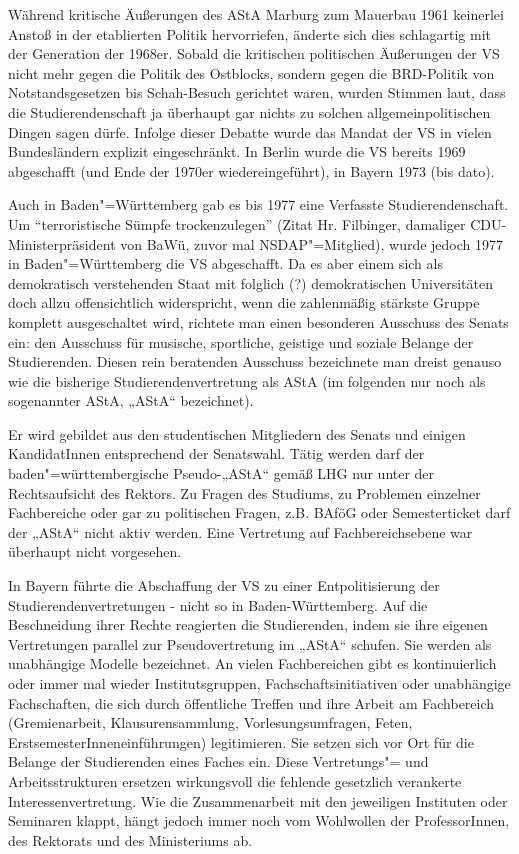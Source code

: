 Während kritische Äußerungen des AStA Marburg zum Mauerbau 1961 keinerlei Anstoß in der etablierten Politik hervorriefen, änderte sich dies schlagartig mit der Generation der 1968er. Sobald die kritischen politischen Äußerungen der VS nicht mehr gegen die Politik des Ostblocks, sondern gegen die BRD-Politik von Notstandsgesetzen bis Schah-Besuch gerichtet waren, wurden Stimmen laut, dass die Studierendenschaft ja überhaupt gar nichts zu solchen allgemeinpolitischen Dingen sagen dürfe. Infolge dieser Debatte wurde das Mandat der VS in vielen Bundesländern explizit eingeschränkt. In Berlin wurde die VS bereits 1969 abgeschafft (und Ende der 1970er wiedereingeführt), in Bayern 1973 (bis dato).

Auch in Baden"=Württemberg gab es bis 1977 eine Verfasste Studierendenschaft. Um "`terroristische Sümpfe trockenzulegen"' (Zitat Hr. Filbinger, damaliger CDU-Ministerpräsident von BaWü, zuvor mal NSDAP"=Mitglied), wurde jedoch 1977 in Baden"=Württemberg die VS abgeschafft. Da es aber einem sich als demokratisch verstehenden Staat mit folglich (?) demokratischen Universitäten doch allzu offensichtlich widerspricht, wenn die zahlenmäßig stärkste Gruppe komplett ausgeschaltet wird, richtete man einen besonderen Ausschuss des Senats ein: den Ausschuss für musische, sportliche, geistige und soziale Belange der Studierenden. Diesen rein beratenden Ausschuss bezeichnete man dreist genauso wie die bisherige Studierendenvertretung als AStA (im folgenden nur noch als sogenannter AStA, „AStA“ bezeichnet).

Er wird gebildet aus den studentischen Mitgliedern des Senats und einigen KandidatInnen entsprechend der Senatswahl. Tätig werden darf der baden"=württembergische Pseudo-„AStA“ gemäß LHG nur unter der Rechtsaufsicht des Rektors. Zu Fragen des Studiums, zu Problemen einzelner Fachbereiche oder gar zu politischen Fragen, z.B. BAföG oder Semesterticket darf der „AStA“ nicht aktiv werden. Eine Vertretung auf Fachbereichsebene war überhaupt nicht
vorgesehen.

In Bayern führte die Abschaffung der VS zu einer Entpolitisierung der Studierendenvertretungen - nicht so in Baden-Württemberg. Auf die Beschneidung ihrer Rechte reagierten die Studierenden, indem sie ihre eigenen Vertretungen parallel zur Pseudovertretung im „AStA“ schufen. Sie werden als unabhängige Modelle bezeichnet. An vielen Fachbereichen gibt es kontinuierlich oder immer mal wieder Institutsgruppen, Fachschaftsinitiativen oder unabhängige Fachschaften, die sich durch öffentliche Treffen und ihre Arbeit am Fachbereich (Gremienarbeit, Klausurensammlung, Vorlesungsumfragen, Feten, ErstsemesterInneneinführungen) legitimieren. Sie setzen sich vor Ort für die Belange der Studierenden eines Faches ein. Diese Vertretungs"= und Arbeitsstrukturen ersetzen wirkungsvoll die fehlende gesetzlich verankerte Interessenvertretung. Wie die Zusammenarbeit mit den jeweiligen Instituten oder Seminaren klappt, hängt jedoch immer noch vom Wohlwollen der ProfessorInnen, des Rektorats und des Ministeriums ab.

